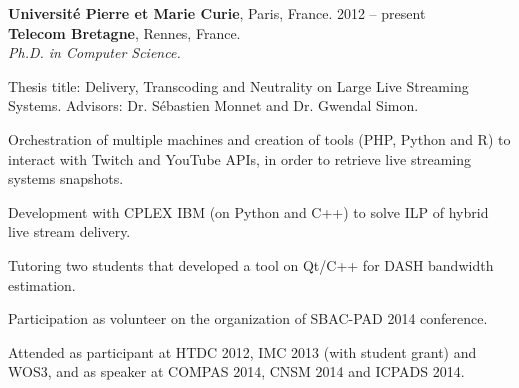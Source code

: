 \documentclass[margin,centered,10pt]{resume}
\begin{document}
\begin{resume}
    \textbf{Université Pierre et Marie Curie}, Paris, France.
    \hfill 2012 – present\\
    \textbf{Telecom Bretagne}, Rennes, France.    
    \\
    \textsl{Ph.D. in Computer Science.}
    \vspace{-3mm}\\\vspace{-1mm}%
    \begin{list3}
        \item Thesis title: Delivery, Transcoding and Neutrality on Large Live Streaming Systems. Advisors: Dr. Sébastien Monnet and Dr. Gwendal Simon. %
        \item Orchestration of multiple machines and creation of tools (PHP, Python and R) to interact with Twitch and YouTube APIs, in order to retrieve live streaming systems snapshots.
        \item Development with CPLEX IBM (on Python and C++) to solve ILP of hybrid live stream delivery.
        \item Tutoring two students that developed a tool on Qt/C++ for DASH bandwidth estimation.        %
        \item Participation as volunteer on the organization of SBAC-PAD 2014 conference.
        \item Attended as participant at HTDC 2012, IMC 2013 (with student grant) and WOS3, and as speaker at COMPAS 2014, CNSM 2014 and ICPADS 2014.%
    \end{list3}
    \vspace{-1.5mm}%



\end{resume}
\end{document}

